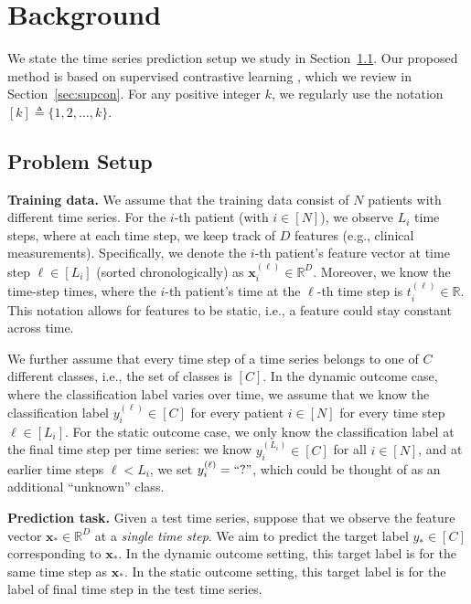 \documentclass[pmlr,twocolumn,10pt]{jmlr} %
\begin{document}
\vspace{-1em}
\section{Background}
\label{sec:background}
\vspace{-.25em}
We state the time series prediction setup we study in Section~\ref{sec:problem-setup}. Our proposed method is based on supervised contrastive learning \citep{khosla2020supervised}, which we review in Section~\ref{sec:supcon}. For any positive integer $k$, we regularly use the notation $[k]\triangleq \{1,2,\dots,k\}$.

\vspace{-1em}
\subsection{Problem Setup}
\label{sec:problem-setup}
\vspace{-.25em}

\noindent
\textbf{Training data.}
We assume that the training data consist of $N$ patients with different time series.
For the \mbox{$i$-th} patient (with $i\in[N]$), we observe $L_i$ time steps, where at each time step, we keep track of $D$ features (e.g., clinical measurements). Specifically, we denote the \mbox{$i$-th} patient's feature vector at time step $\ell\in[L_i]$ (sorted chronologically) as $\mathbf{x}_i^{(\ell)}\in\mathbb{R}^{D}$. 
Moreover, we know the time-step times, where the \mbox{$i$-th} patient's time at the $\ell$-th time step is $t_i^{(\ell)}\in\mathbb{R}$.
This notation allows for features to be static, i.e., a feature could stay constant across time.

We further assume that every time step of a time series belongs to one of $C$ different classes, i.e., the set of classes is $[C]$. In the dynamic outcome case, where the classification label varies over time, we assume that we know the classification label $y_i^{(\ell)}\in[C]$ for every patient
$i\in[N]$ for every time step $\ell\in[L_i]$. For the static outcome case, we only know the classification label at the final time step per time series: we know $y_i^{(L_i)}\in[C]$ for all $i\in[N]$, and at earlier time steps $\ell < L_i$, we set $y_i^{(\ell)}=``?"$, which could be thought of as an additional ``unknown'' class.

\vspace{.2em}
\noindent
\textbf{Prediction task.} Given a test time series, suppose that we observe the feature vector $\mathbf{x}_*\in\mathbb{R}^{D}$ at a \emph{single time step}. We aim to predict the target label $y_*\in[C]$ corresponding to $\mathbf{x}_*$. In the dynamic outcome setting, this target label is for the same time step as $\mathbf{x}_*$. In the static outcome setting, this target label is for the label of final time step in the test time series.
\end{document}
